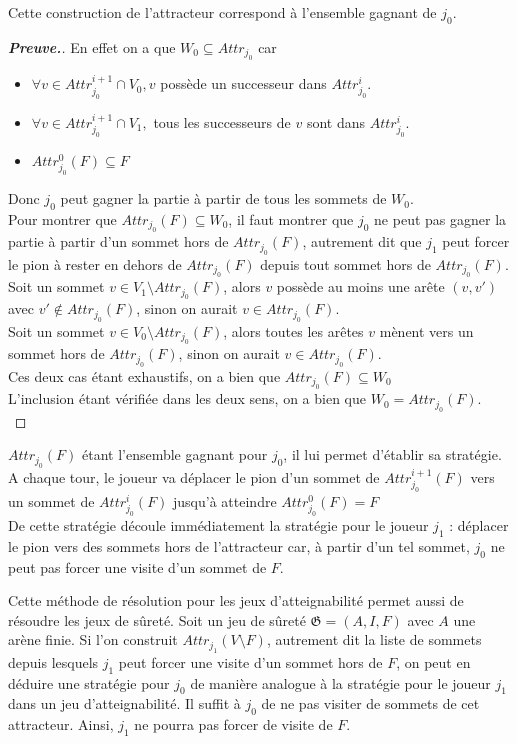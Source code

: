 \documentclass[12pt,a4paper,oneside, titlepage]{report}
\newenvironment{demonstration}{\begin{proof}[\textnormal{\textbf{Preuve.}}]}{\end{proof}}
\begin{document}
\noindent Cette construction de l'attracteur correspond à l'ensemble gagnant de $j_0$.\\
\begin{demonstration}{
En effet on a que $W_0 \subseteq Attr_{j_0}$ car
\begin{itemize}
\item $\forall v \in Attr_{j_0}^{i+1}\cap V_0, v$ possède un successeur dans $Attr_{j_0}^i$.
\item $\forall v \in Attr_{j_0}^{i+1}\cap V_1,$ tous les successeurs de $v$ sont dans $Attr_{j_0}^i$.
\item $Attr_{j_0}^0(F) \subseteq F$
\end{itemize}
Donc $j_0$ peut gagner la partie à partir de tous les sommets de $W_0$.\\

\noindent Pour montrer que $Attr_{j_0}(F)\subseteq W_0$, il faut montrer que $j_0$ ne peut pas gagner la partie à partir d'un sommet hors de $Attr_{j_0}(F)$, autrement dit que $j_1$ peut forcer le pion à rester en dehors de $Attr_{j_0}(F)$ depuis tout sommet hors de $Attr_{j_0}(F)$.\\
Soit un sommet $v\in V_1\setminus Attr_{j_0}(F)$, alors $v$ possède au moins une arête $(v, v')$ avec $v'\notin Attr_{j_0}(F)$, sinon on aurait $v \in Attr_{j_0}(F)$.\\
Soit  un sommet $v\in V_0\setminus Attr_{j_0}(F)$, alors toutes les arêtes $v$
mènent vers un sommet hors de $Attr_{j_0}(F)$, sinon on aurait $v \in Attr_{j_0}(F)$.\\
Ces deux cas étant exhaustifs, on a bien que $Attr_{j_0}(F)\subseteq W_0$\\

\noindent L'inclusion étant vérifiée dans les deux sens, on a bien que $W_0 = Attr_{j_0}(F)$.\\}
\end{demonstration}


\noindent $Attr_{j_0}(F)$ étant l'ensemble gagnant pour $j_0$, il lui permet d'établir sa stratégie. A chaque tour, le joueur va déplacer le pion d'un sommet de $Attr_{j_0}^{i+1}(F)$ vers un sommet de $Attr_{j_0}^i(F)$ jusqu'à atteindre $Attr_{j_0}^0(F) = F$\\
De cette stratégie découle immédiatement la stratégie pour le joueur $j_1$ : déplacer le pion vers des sommets hors de l'attracteur car, à partir d'un tel sommet, $j_0$ ne peut pas forcer une visite d'un sommet de $F$.

Cette méthode de résolution pour les jeux d'atteignabilité permet aussi de résoudre les jeux de sûreté. Soit un jeu de sûreté $\mathfrak{G} = (A, I, F)$ avec $A$ une arène finie. Si l'on construit $Attr_{j_1}(V\setminus F)$, autrement dit la liste de sommets depuis lesquels $j_1$ peut forcer une visite d'un sommet hors de $F$, on peut en déduire une stratégie pour $j_0$ de manière analogue à la stratégie pour le joueur $j_1$ dans un jeu d'atteignabilité. Il suffit à $j_0$ de ne pas visiter de sommets de cet attracteur. Ainsi, $j_1$ ne pourra pas forcer de visite de $F$.
\end{document}
